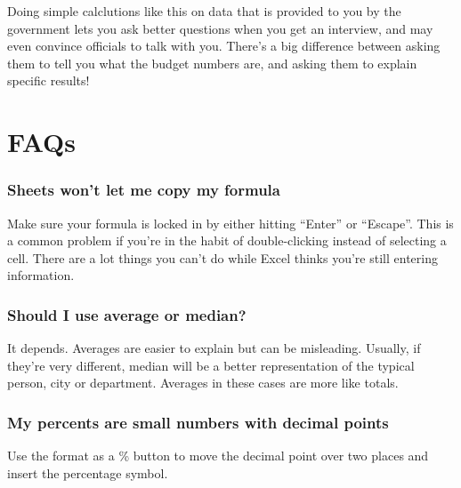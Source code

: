 \documentclass[
  letterpaper,
  DIV=11,
  numbers=noendperiod]{scrreprt}
\begin{document}
Doing simple calclutions like this on data that is provided to you by
the government lets you ask better questions when you get an interview,
and may even convince officials to talk with you. There's a big
difference between asking them to tell you what the budget numbers are,
and asking them to explain specific results!

\hypertarget{faqs}{%
\section{FAQs}\label{faqs}}

\hypertarget{sheets-wont-let-me-copy-my-formula}{%
\subsubsection*{Sheets won't let me copy my
formula}\label{sheets-wont-let-me-copy-my-formula}}

Make sure your formula is locked in by either hitting ``Enter'' or
``Escape''. This is a common problem if you're in the habit of
double-clicking instead of selecting a cell. There are a lot things you
can't do while Excel thinks you're still entering information.

\hypertarget{should-i-use-average-or-median}{%
\subsubsection*{Should I use average or
median?}\label{should-i-use-average-or-median}}

It depends. Averages are easier to explain but can be misleading.
Usually, if they're very different, median will be a better
representation of the typical person, city or department. Averages in
these cases are more like totals.

\hypertarget{my-percents-are-small-numbers-with-decimal-points}{%
\subsubsection*{My percents are small numbers with decimal
points}\label{my-percents-are-small-numbers-with-decimal-points}}

Use the format as a \% button to move the decimal point over two places
and insert the percentage symbol.
\end{document}
